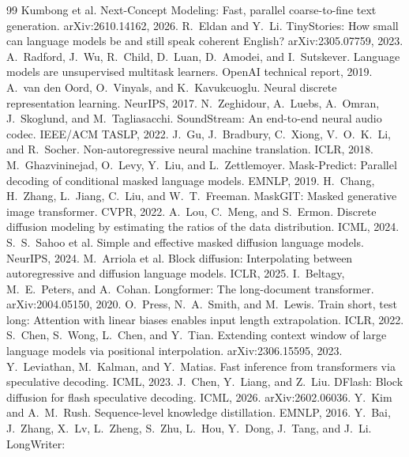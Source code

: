 \documentclass[10pt,twocolumn]{article}
\begin{document}
\begin{thebibliography}{99}\footnotesize\setlength{\itemsep}{1pt}
 Kumbong et al. Next-Concept Modeling: Fast, parallel coarse-to-fine text generation.
  arXiv:2610.14162, 2026.
 R.~Eldan and Y.~Li. TinyStories: How small can language models be and still speak coherent
  English? arXiv:2305.07759, 2023.
 A.~Radford, J.~Wu, R.~Child, D.~Luan, D.~Amodei, and I.~Sutskever. Language models are unsupervised
  multitask learners. OpenAI technical report, 2019.
 A.~van den Oord, O.~Vinyals, and K.~Kavukcuoglu. Neural discrete representation learning. NeurIPS,
  2017.
 N.~Zeghidour, A.~Luebs, A.~Omran, J.~Skoglund, and M.~Tagliasacchi. SoundStream: An end-to-end
  neural audio codec. IEEE/ACM TASLP, 2022.
 J.~Gu, J.~Bradbury, C.~Xiong, V.~O.~K.~Li, and R.~Socher. Non-autoregressive neural machine
  translation. ICLR, 2018.
 M.~Ghazvininejad, O.~Levy, Y.~Liu, and L.~Zettlemoyer. Mask-Predict: Parallel decoding of
  conditional masked language models. EMNLP, 2019.
 H.~Chang, H.~Zhang, L.~Jiang, C.~Liu, and W.~T.~Freeman. MaskGIT: Masked generative image
  transformer. CVPR, 2022.
 A.~Lou, C.~Meng, and S.~Ermon. Discrete diffusion modeling by estimating the ratios of the data
  distribution. ICML, 2024.
 S.~S.~Sahoo et al. Simple and effective masked diffusion language models. NeurIPS, 2024.
 M.~Arriola et al. Block diffusion: Interpolating between autoregressive and diffusion language
  models. ICLR, 2025.
 I.~Beltagy, M.~E.~Peters, and A.~Cohan. Longformer: The long-document transformer.
  arXiv:2004.05150, 2020.
 O.~Press, N.~A.~Smith, and M.~Lewis. Train short, test long: Attention with linear biases enables
  input length extrapolation. ICLR, 2022.
 S.~Chen, S.~Wong, L.~Chen, and Y.~Tian. Extending context window of large language models via
  positional interpolation. arXiv:2306.15595, 2023.
 Y.~Leviathan, M.~Kalman, and Y.~Matias. Fast inference from transformers via speculative
  decoding. ICML, 2023.
 J.~Chen, Y.~Liang, and Z.~Liu. DFlash: Block diffusion for flash speculative decoding. ICML, 2026.
  arXiv:2602.06036.
 Y.~Kim and A.~M.~Rush. Sequence-level knowledge distillation. EMNLP, 2016.
 Y.~Bai, J.~Zhang, X.~Lv, L.~Zheng, S.~Zhu, L.~Hou, Y.~Dong, J.~Tang, and J.~Li. LongWriter:

\end{thebibliography}
\end{document}
